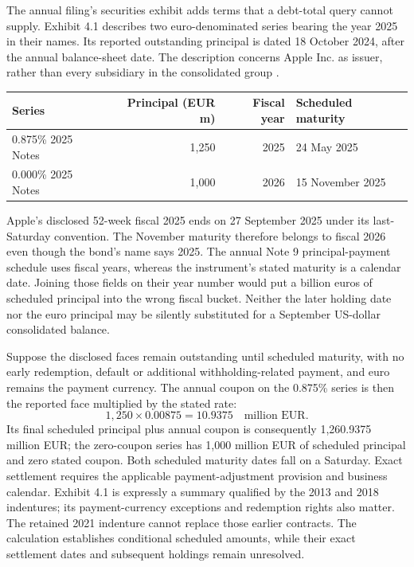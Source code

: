 The annual filing's securities exhibit adds terms that a debt-total query
cannot supply. Exhibit 4.1 describes two euro-denominated series bearing the
year 2025 in their names. Its reported outstanding principal is dated
18 October 2024, after the annual balance-sheet date. The description concerns
Apple Inc. as issuer, rather than every subsidiary in the consolidated group
\citep[Exhibit 4.1, pp.~3--4]{apple2024}.

\begin{center}
\begin{tabular}{lrrl}
\toprule
Series & Principal (EUR m) & Fiscal year & Scheduled maturity\\\midrule
0.875\% 2025 Notes &1,250&2025&24 May 2025\\
0.000\% 2025 Notes &1,000&2026&15 November 2025\\\bottomrule
\end{tabular}
\end{center}

Apple's disclosed 52-week fiscal 2025 ends on 27 September 2025 under its
last-Saturday convention. The November maturity therefore belongs to fiscal
2026 even though the bond's name says 2025. The annual Note 9 principal-payment
schedule uses fiscal years, whereas the instrument's stated maturity is a
calendar date. Joining those fields on their year number would put a billion
euros of scheduled principal into the wrong fiscal bucket. Neither the later
holding date nor the euro principal may be silently substituted for a
September US-dollar consolidated balance.

Suppose the disclosed faces remain outstanding until scheduled maturity, with
no early redemption, default or additional withholding-related payment, and
euro remains the payment currency. The annual coupon on the 0.875\% series is
then the reported face multiplied by the stated rate:
\[
       1{,}250\times0.00875=10.9375\quad\text{million EUR}.
\]
Its final scheduled principal plus annual coupon is consequently
1,260.9375 million EUR; the zero-coupon series has 1,000 million EUR of
scheduled principal and zero stated coupon. Both scheduled maturity dates
fall on a Saturday. Exact settlement requires the applicable payment-adjustment
provision and business calendar. Exhibit 4.1 is expressly a summary qualified
by the 2013 and 2018 indentures; its payment-currency exceptions and redemption
rights also matter. The retained 2021 indenture cannot replace those earlier
contracts. The calculation establishes conditional scheduled amounts, while
their exact settlement dates and subsequent holdings remain unresolved.

